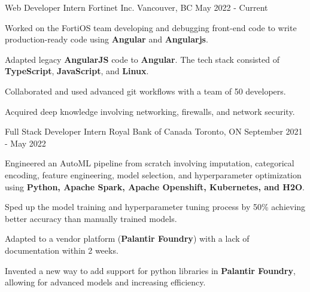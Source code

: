 

\begin{cventries}

	\cventry
	{Web Developer Intern } %
	{Fortinet Inc. } %
	{Vancouver, BC } %
	{May 2022 - Current} %
	{
		\begin{cvitems} %
			\item {Worked on the FortiOS team developing and debugging front-end code to write production-ready code using \textbf{Angular} and \textbf{Angularjs}.}
			\item {Adapted legacy \textbf{AngularJS} code to \textbf{Angular}. The tech stack consisted of \textbf{TypeScript}, \textbf{JavaScript}, and \textbf{Linux}.}
			\item {Collaborated and used advanced git workflows with a team of 50 developers.}
			\item {Acquired deep knowledge involving networking, firewalls, and network security.}
		\end{cvitems}
	}

	\cventry
	{Full Stack Developer Intern } %
	{Royal Bank of Canada } %
	{Toronto, ON } %
	{September 2021 - May 2022} %
	{
		\begin{cvitems} %
			\item {Engineered an AutoML pipeline from scratch involving imputation, categorical encoding, feature engineering, model selection, and hyperparameter optimization using \textbf{Python, Apache Spark, Apache Openshift, Kubernetes, and H2O}.} 
			\item {Sped up the model training and hyperparameter tuning process by 50\% achieving better accuracy than manually trained models.}
			\item {Adapted to a vendor platform (\textbf{Palantir Foundry}) with a lack of documentation within 2 weeks.}
			\item {Invented a new way to add support for python libraries in \textbf{Palantir Foundry}, allowing for advanced models and increasing efficiency.}
		\end{cvitems}
	}


\end{cventries}
